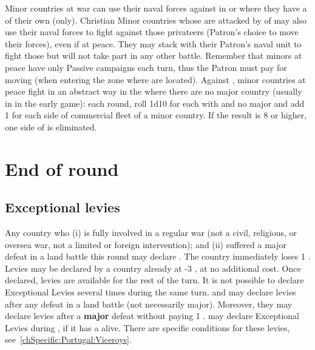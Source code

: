 \bparag Minor countries at war can use their naval forces against \corsaire in
\STZ or \CTZ where they have a \TradeFLEET of their own (only).
\bparag Christian Minor countries whose \TradeFLEET are attacked by \corsaire
of \Barbaresques may also use their naval forces to fight against those
privateers (Patron's choice to move their forces), even if at peace. They may
stack with their Patron's naval unit to fight those \corsaire but will not
take part in any other battle.
\bparag Remember that minors at peace have only Passive campaigns each turn,
thus the Patron must pay for moving (when entering the zone where \corsaire
are located).
\bparag Against , minor countries at peace fight in an abstract
way in the \STZ where there are no major country \TradeFLEET (usually in
 in the early game): each round, roll 1d10 for each \STZ with
 \corsaire and no major \TradeFLEET and add 1 for each side of
commercial fleet of a minor country.  If the result is 8 or higher, one
side of \corsaire is eliminated.

\section{End of round}
\label{chMilitary:End of round}
\subsection{Exceptional levies}
\label{chMilitary:Exceptional Levies}

\bparag Any country who (i) is fully involved in a regular war (not a civil,
religious, or oversea war, not a limited or foreign intervention); and (ii)
suffered a major defeat in a land battle this round may declare
.
\bparag The country immediately loses 1 \STAB. Levies may be declared by a
country already at -3 \STAB, at no additional cost.
\bparag Once declared, levies are available for the rest of the turn. It is
not possible to declare Exceptional Levies several times during the same
turn.
\bparag[Exception:] \SUE and \PRU may declare levies after any defeat in a land
battle (not necessarily major). Moreover, they may declare levies after
a \textbf{major} defeat without paying 1 \STAB.
\bparag[Exception:] \POR may declare Exceptional Levies during , if it has a  alive. There are specific conditions for
these levies, see~\ref{chSpecific:Portugal:Viceroys}.

